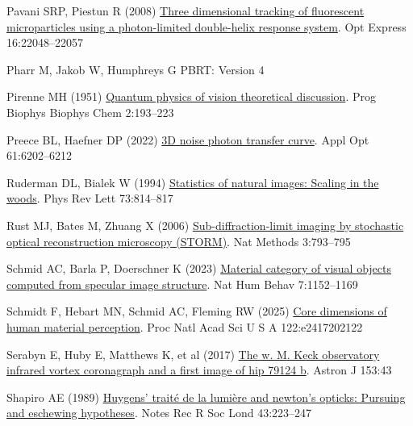 \documentclass[
  letterpaper,
]{book}
\newlength{\cslhangindent}
\newenvironment{CSLReferences}[2] %
 {\begin{list}{}{%
  \setlength{\itemindent}{0pt}
  \setlength{\leftmargin}{0pt}
  \setlength{\parsep}{0pt}
  \ifodd #1
   \setlength{\leftmargin}{\cslhangindent}
   \setlength{\itemindent}{-1\cslhangindent}
  \fi
  \setlength{\itemsep}{#2\baselineskip}}}
 {\end{list}}
\begin{document}
\begin{CSLReferences}{1}{1}
Pavani SRP, Piestun R (2008)
\href{http://dx.doi.org/10.1364/OE.16.022048}{Three dimensional tracking
of fluorescent microparticles using a photon-limited double-helix
response system}. Opt Express 16:22048--22057

Pharr M, Jakob W, Humphreys G {PBRT}: {Version} 4

Pirenne MH (1951)
\href{http://dx.doi.org/10.1016/s0096-4174(18)30026-x}{Quantum physics
of vision theoretical discussion}. Prog Biophys Biophys Chem 2:193--223

Preece BL, Haefner DP (2022)
\href{http://dx.doi.org/10.1364/AO.452166}{{3D} noise photon transfer
curve}. Appl Opt 61:6202--6212

Ruderman DL, Bialek W (1994)
\href{http://dx.doi.org/10.1103/PhysRevLett.73.814}{Statistics of
natural images: Scaling in the woods}. Phys Rev Lett 73:814--817

Rust MJ, Bates M, Zhuang X (2006)
\href{http://dx.doi.org/10.1038/nmeth929}{Sub-diffraction-limit imaging
by stochastic optical reconstruction microscopy ({STORM})}. Nat Methods
3:793--795

Schmid AC, Barla P, Doerschner K (2023)
\href{https://www.nature.com/articles/s41562-023-01601-0}{Material
category of visual objects computed from specular image structure}. Nat
Hum Behav 7:1152--1169

Schmidt F, Hebart MN, Schmid AC, Fleming RW (2025)
\href{http://dx.doi.org/10.1073/pnas.2417202122}{Core dimensions of
human material perception}. Proc Natl Acad Sci U S A 122:e2417202122

Serabyn E, Huby E, Matthews K, et al (2017)
\href{http://dx.doi.org/10.3847/1538-3881/153/1/43}{The w. {M}. Keck
observatory infrared vortex coronagraph and a first image of hip 79124
b}. Astron J 153:43

Shapiro AE (1989)
\href{http://dx.doi.org/10.1098/rsnr.1989.0016}{Huygens' traité de la
lumière and newton's opticks: Pursuing and eschewing hypotheses}. Notes
Rec R Soc Lond 43:223--247


\end{CSLReferences}
\end{document}
